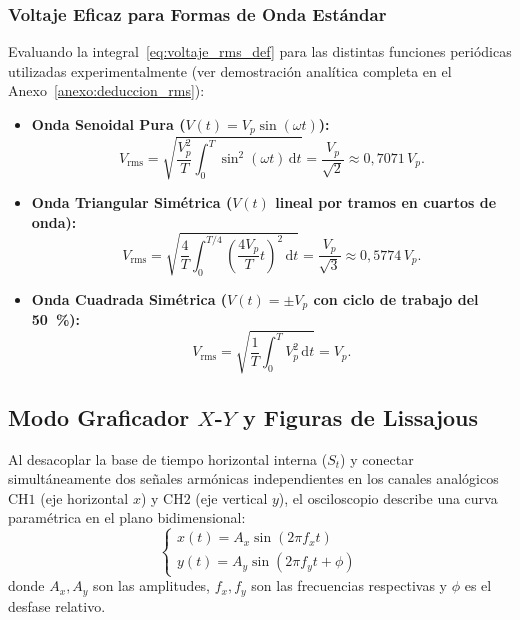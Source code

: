 \subsubsection{Voltaje Eficaz para Formas de Onda Estándar}
Evaluando la integral~\eqref{eq:voltaje_rms_def} para las distintas funciones periódicas utilizadas experimentalmente (ver demostración analítica completa en el Anexo~\ref{anexo:deduccion_rms}):
\begin{itemize}
    \item \textbf{Onda Senoidal Pura ($V(t) = V_p \sin(\omega t)$):}
    \begin{equation}
        V_{\text{rms}} = \sqrt{\frac{V_p^2}{T} \int_0^T \sin^2(\omega t)\,\mathrm{d}t} = \frac{V_p}{\sqrt{2}} \approx 0{,}7071\,V_p. \label{eq:rms_seno}
    \end{equation}
    \item \textbf{Onda Triangular Simétrica ($V(t)$ lineal por tramos en cuartos de onda):}
    \begin{equation}
        V_{\text{rms}} = \sqrt{\frac{4}{T} \int_0^{T/4} \left(\frac{4 V_p}{T} t\right)^2\,\mathrm{d}t} = \frac{V_p}{\sqrt{3}} \approx 0{,}5774\,V_p. \label{eq:rms_triang}
    \end{equation}
    \item \textbf{Onda Cuadrada Simétrica ($V(t) = \pm V_p$ con ciclo de trabajo del \qty{50}{\percent}):}
    \begin{equation}
        V_{\text{rms}} = \sqrt{\frac{1}{T} \int_0^T V_p^2\,\mathrm{d}t} = V_p. \label{eq:rms_cuadrada}
    \end{equation}
\end{itemize}

\subsection{Modo Graficador \texorpdfstring{$X$-$Y$}{X-Y} y Figuras de Lissajous}
Al desacoplar la base de tiempo horizontal interna ($S_t$) y conectar simultáneamente dos señales armónicas independientes en los canales analógicos $\text{CH1}$ (eje horizontal $x$) y $\text{CH2}$ (eje vertical $y$), el osciloscopio describe una curva paramétrica en el plano bidimensional:
\begin{equation}
    \begin{cases}
        x(t) = A_x \sin(2\pi f_x t) \\
        y(t) = A_y \sin(2\pi f_y t + \phi)
    \end{cases} \label{eq:lissajous_param}
\end{equation}
donde $A_x, A_y$ son las amplitudes, $f_x, f_y$ son las frecuencias respectivas y $\phi$ es el desfase relativo.

